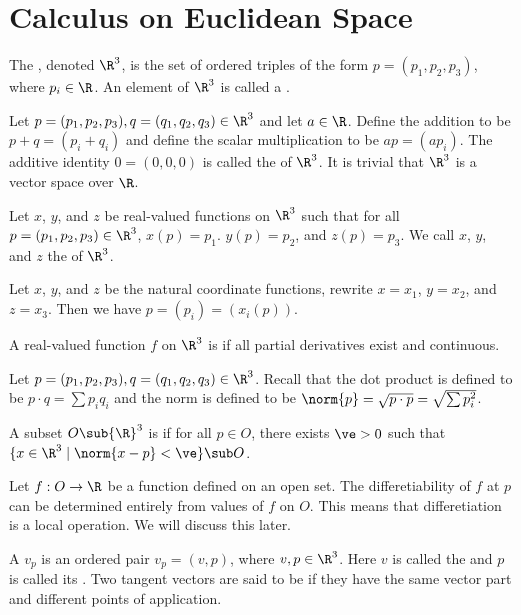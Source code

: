 \documentclass[10pt]{article}
\begin{document}
\hstart
\section{Calculus on Euclidean Space}
\begin{definition}
    The , denoted ${\R}^{3}$, is the set of ordered triples of the form $p=({p}_{1},{p}_{2},{p}_{3})$, where ${p}_{i}\in\R$. An element of ${\R}^{3}$ is called a .
\end{definition}
\par
Let $p=({p}_{1},{p}_{2},{p}_{3}),q=({q}_{1},{q}_{2},{q}_{3})\in{\R}^{3}$ and let $a\in\R$. Define the addition to be $p+q=({p}_{i}+{q}_{i})$ and define the scalar multiplication to be $ap=(a{p}_{i})$. The additive identity $0=(0,0,0)$ is called the  of ${\R}^{3}$. It is trivial that ${\R}^{3}$ is a vector space over $\R$.
\begin{definition}
    Let $x$, $y$, and $z$ be real-valued functions on ${\R}^{3}$ such that for all $p=({p}_{1},{p}_{2},{p}_{3})\in{\R}^{3}$, $x(p)={p}_{1}$. $y(p)={p}_{2}$, and $z(p)={p}_{3}$. We call $x$, $y$, and $z$ the  of ${\R}^{3}$.
\end{definition}
\par
Let $x$, $y$, and $z$ be the natural coordinate functions, rewrite $x={x}_{1}$, $y={x}_{2}$, and $z={x}_{3}$. Then we have $p=({p}_{i})=({x}_{i}(p))$.
\begin{definition}
    A real-valued function $f$ on ${\R}^{3}$ is  if all partial derivatives exist and continuous.
\end{definition}
\par
Let $p=({p}_{1},{p}_{2},{p}_{3}),q=({q}_{1},{q}_{2},{q}_{3})\in{\R}^{3}$. Recall that the dot product is defined to be $p\cdot q=\sum{p}_{i}{q}_{i}$ and the norm is defined to be $\norm{p}=\sqrt{p\cdot p}=\sqrt{\sum{p}_{i}^{2}}$. 
\begin{definition}
    A subset $O\sub{\R}^{3}$ is  if for all $p\in O$, there exists $\ve>0$ such that $\{x\in{\R}^{3}\mid\norm{x-p}<\ve\}\sub O$. 
\end{definition}
\par
Let $f:O\to\R$ be a function defined on an open set. The differetiability of $f$ at $p$ can be determined entirely from values of $f$ on $O$. This means that differetiation is a local operation. We will discuss this later.
\begin{definition}
    A  ${v}_{p}$ is an ordered pair ${v}_{p}=(v,p)$, where $v,p\in{\R}^{3}$. Here $v$ is called the  and $p$ is called its . Two tangent vectors are said to be  if they have the same vector part and different points of application.
\end{definition}
\end{document}
